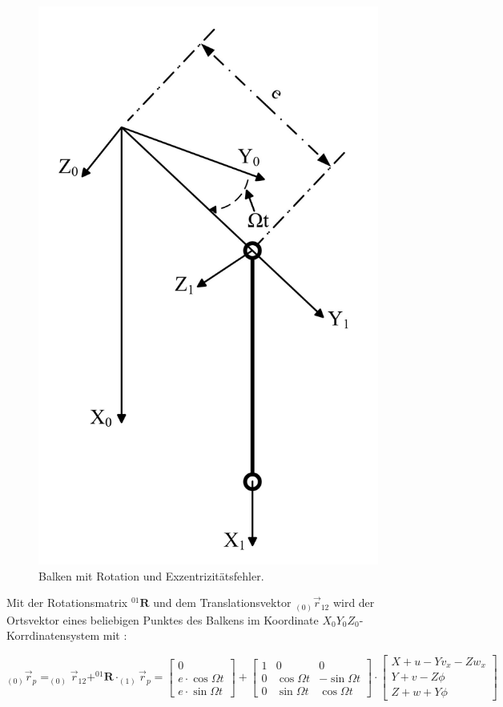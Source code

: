 	\begin{figure}[H]
		\centering
		\includegraphics[width=0.45\linewidth, height=0.45\textheight]{Berechnungsmodell/Ekin_Rotation}
		\caption{Balken mit Rotation und Exzentrizitätsfehler.}
		\label{fig:Ekin-Rotation}
	\end{figure}
	
	
	Mit der Rotationsmatrix $ ^{01}\mathbf{R} $ und dem Translationsvektor $ _{(0)}\vec{r}_{12} $ wird der Ortsvektor eines beliebigen Punktes des Balkens im Koordinate $ X_{0}Y_{0}Z_{0} $-Korrdinatensystem mit \cite{heimann2015mechatronik} :
	
	\begin{equation}\label{equ:Vektor-(0)rp}
	_{\left( 0\right) }\vec{r}_{p} = _{\left( 0\right) }\vec{r}_{12} + ^{01}\mathbf{R}\cdot_{\left( 1\right) }\vec{r}_{p} =
	\left[ 
	\begin{array}{c}
	0\\
	e\cdot\cos \Omega t\\
	e\cdot\sin \Omega t
	\end{array}
	\right] +
	\left[  
	\begin{array}{ccc}
	1 & 0 & 0\\
	0 & \cos\Omega t & -\sin\Omega t\\
	0 & \sin\Omega t & \cos\Omega t
	\end{array} 
	\right] \cdot
	\left[
	\begin{array}{l}
	X+u-Yv_{x}-Zw_{x}\\
	Y+v-Z\phi\\
	Z+w+Y\phi
	\end{array}
	\right] 
	\end{equation}
	
